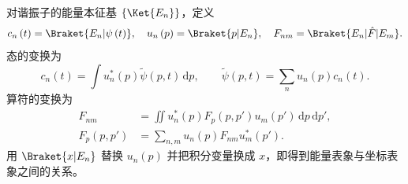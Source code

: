 对谐振子的能量本征基 $\left\{\Ket{E_n}\right\}$，定义
\begin{equation}
c_n\left(t\right)=\Braket{E_n|\psi\left(t\right)},\quad
u_n\left(p\right)=\Braket{p|E_n},\quad F_{nm}=\Braket{E_n|\hat F|E_m}.
\end{equation}
态的变换为
\begin{equation}
c_n\left(t\right)=\int u_n^*\left(p\right)\widetilde\psi\left(p,t\right)\,\mathrm{d}p,
\qquad\widetilde\psi\left(p,t\right)=\sum_n u_n\left(p\right)c_n\left(t\right).
\end{equation}
算符的变换为
\begin{align}
F_{nm}&=\iint u_n^*\left(p\right)F_p\left(p,p'\right)u_m\left(p'\right)\,\mathrm{d}p\,\mathrm{d}p',\\
F_p\left(p,p'\right)&=\sum_{n,m}u_n\left(p\right)F_{nm}u_m^*\left(p'\right).
\end{align}
用 $\Braket{x|E_n}$ 替换 $u_n\left(p\right)$ 并把积分变量换成 $x$，即得到能量表象与坐标表象之间的关系。
